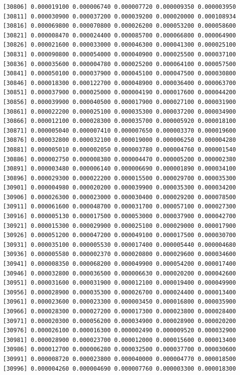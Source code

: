 \documentclass[]{article}
\begin{document}
\begin{verbatim}
[30806] 0.000019100 0.000006740 0.000007720 0.000009350 0.000003950
[30811] 0.000030900 0.000037200 0.000039200 0.000020000 0.000108934
[30816] 0.000069800 0.000070800 0.000026200 0.000053200 0.000058600
[30821] 0.000008470 0.000024400 0.000085700 0.000066800 0.000064900
[30826] 0.000021600 0.000033000 0.000046300 0.000041300 0.000025100
[30831] 0.000090800 0.000054000 0.000040900 0.000025500 0.000037100
[30836] 0.000035600 0.000004780 0.000025200 0.000064100 0.000057500
[30841] 0.000050100 0.000037900 0.000045100 0.000047500 0.000030800
[30846] 0.000018300 0.000122700 0.000048900 0.000036400 0.000063700
[30851] 0.000037900 0.000025000 0.000004190 0.000017600 0.000044200
[30856] 0.000039900 0.000040500 0.000017900 0.000027100 0.000031900
[30861] 0.000022200 0.000025100 0.000035300 0.000037200 0.000034900
[30866] 0.000012100 0.000028300 0.000035700 0.000005920 0.000018100
[30871] 0.000005040 0.000007410 0.000007650 0.000003370 0.000019600
[30876] 0.000032800 0.000032100 0.000019000 0.000006250 0.000004280
[30881] 0.000005010 0.000002050 0.000003780 0.000004760 0.000001540
[30886] 0.000002750 0.000008380 0.000004470 0.000005200 0.000002380
[30891] 0.000003480 0.000006140 0.000006690 0.000001890 0.000034100
[30896] 0.000029300 0.000022200 0.000015500 0.000029700 0.000035300
[30901] 0.000004980 0.000020200 0.000039900 0.000035300 0.000034200
[30906] 0.000026300 0.000023000 0.000030400 0.000029200 0.000078500
[30911] 0.000061600 0.000048700 0.000031700 0.000057100 0.000027300
[30916] 0.000005130 0.000017500 0.000053000 0.000037900 0.000042700
[30921] 0.000015300 0.000029900 0.000025100 0.000029000 0.000017900
[30926] 0.000051200 0.000047200 0.000049100 0.000017500 0.000030700
[30931] 0.000035100 0.000005530 0.000017400 0.000005440 0.000004680
[30936] 0.000005580 0.000002370 0.000020800 0.000029600 0.000034600
[30941] 0.000008350 0.000068200 0.000049900 0.000054200 0.000017400
[30946] 0.000032800 0.000036500 0.000006630 0.000020200 0.000042600
[30951] 0.000031600 0.000031900 0.000012100 0.000019400 0.000049900
[30956] 0.000028900 0.000035300 0.000026700 0.000024400 0.000013400
[30961] 0.000023600 0.000023300 0.000003450 0.000016800 0.000035900
[30966] 0.000028300 0.000027200 0.000017300 0.000023800 0.000028400
[30971] 0.000020300 0.000056200 0.000034900 0.000028900 0.000020200
[30976] 0.000026100 0.000016300 0.000002490 0.000009520 0.000032900
[30981] 0.000028900 0.000023700 0.000012000 0.000015600 0.000013400
[30986] 0.000012700 0.000006280 0.000032500 0.000037700 0.000030600
[30991] 0.000008720 0.000023800 0.000040000 0.000004770 0.000018500
[30996] 0.000004260 0.000004690 0.000007760 0.000003300 0.000018300

\end{verbatim}
\end{document}
